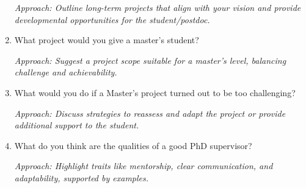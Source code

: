 \documentclass[12pt]{article}
\numberwithin{equation}{section}
\begin{document}
\begin{enumerate}
    \textit{Approach: Outline long-term projects that align with your vision and provide developmental opportunities for the student/postdoc.}

    \item What project would you give a master's student?
    
    \textit{Approach: Suggest a project scope suitable for a master’s level, balancing challenge and achievability.}

    \item What would you do if a Master's project turned out to be too challenging?
    
    \textit{Approach: Discuss strategies to reassess and adapt the project or provide additional support to the student.}

    \item What do you think are the qualities of a good PhD supervisor?
    
    \textit{Approach: Highlight traits like mentorship, clear communication, and adaptability, supported by examples.}
\end{enumerate}
\end{document}
